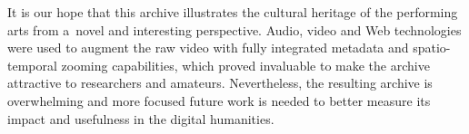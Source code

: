 \documentclass[conference]{IEEEtran}
\newcommand{\todo}[1]{\noindent\textcolor{red}{{\bf \{ToDo} #1{\bf \}}}}
\begin{document}
It is our hope that this archive illustrates the cultural heritage of the performing arts from a~novel and 
interesting perspective. Audio, video and Web technologies were used to augment
the raw video with fully integrated metadata and spatio-temporal zooming capabilities,
which proved invaluable to make the archive attractive to researchers and amateurs.
Nevertheless, the resulting archive is overwhelming and more focused future work is needed to 
better measure its impact and usefulness in the digital humanities. 


















\end{document}
